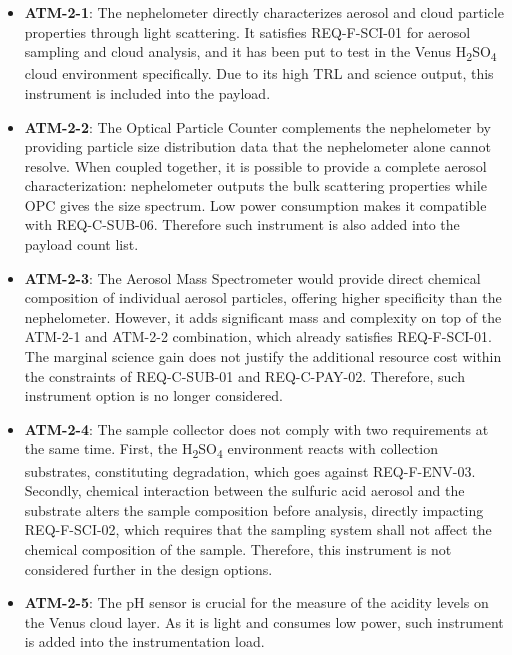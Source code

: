 \begin{itemize}
    \item \textbf{ATM-2-1}: The nephelometer directly characterizes aerosol and cloud particle properties through light scattering. It satisfies REQ-F-SCI-01 for aerosol sampling and cloud analysis, and it has been put to test in the Venus H\textsubscript{2}SO\textsubscript{4} cloud environment specifically. Due to its high TRL and science output, this instrument is included into the payload. 

    \item \textbf{ATM-2-2}: The Optical Particle Counter complements the nephelometer by providing particle size distribution data that the nephelometer alone cannot resolve. When coupled together, it is possible to provide a complete aerosol characterization: nephelometer outputs the bulk scattering properties while OPC gives the size spectrum. Low power consumption makes it compatible with REQ-C-SUB-06. Therefore such instrument is also added into the payload count list.

    \item \textbf{ATM-2-3}: The Aerosol Mass Spectrometer would provide direct chemical composition of individual aerosol particles, offering higher specificity than the nephelometer. However, it adds significant mass and complexity on top of the ATM-2-1 and ATM-2-2 combination, which already satisfies REQ-F-SCI-01. The marginal science gain does not justify the additional resource cost within the constraints of REQ-C-SUB-01 and REQ-C-PAY-02. Therefore, such instrument option is no longer considered. 

    \item \textbf{ATM-2-4}: The sample collector does not comply with two requirements at the same time. First, the H\textsubscript{2}SO\textsubscript{4} environment reacts with collection substrates, constituting degradation, which goes against REQ-F-ENV-03. Secondly, chemical interaction between the sulfuric acid aerosol and the substrate alters the sample composition before analysis, directly impacting REQ-F-SCI-02, which requires that the sampling system shall not affect the chemical composition of the sample. Therefore, this instrument is not considered further in the design options. 

    \item \textbf{ATM-2-5}: The pH sensor is crucial for the measure of the acidity levels on the Venus cloud layer. As it is light and consumes low power, such instrument is added into the instrumentation load. 
\end{itemize}


